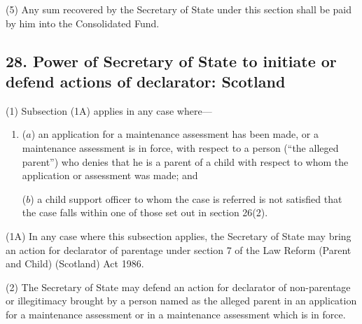 \documentclass[12pt,a4paper]{article}
\begin{document}
(5) Any sum recovered by the Secretary of State under this section shall be paid by him into the Consolidated Fund.


\subsection{28. Power of Secretary of State to initiate or defend actions of declarator: Scotland}

%
%

(1) Subsection (1A) applies in any case where—
\begin{enumerate}\item[]
($a$) an application for a maintenance assessment has been made, or a maintenance assessment is in force, with respect to a person (“the alleged parent”) who denies that he is a parent of a child with respect to whom the application or assessment was made; and

($b$) 
a child support officer to whom the case is referred 
is not satisfied that the case falls within one of those set out in section 26(2).
\end{enumerate}

(1A) In any case where this subsection applies, the Secretary of State may bring an action for declarator of parentage under section 7 of the Law Reform (Parent and Child) (Scotland) Act 1986.

(2) The Secretary of State may defend an action for declarator of non-parentage or illegitimacy brought by a person named as the alleged parent in an application for a maintenance assessment
or in a maintenance assessment which is in force.  %
\end{document}
